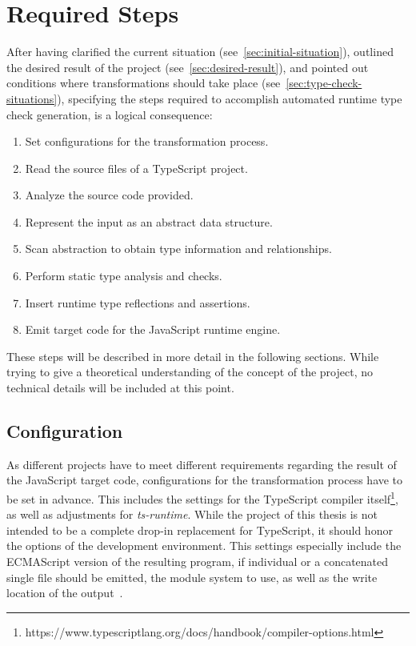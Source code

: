\section{Required Steps}
\label{sec:required-steps}

After having clarified the current situation (see~\ref{sec:initial-situation}), outlined the desired result of the project (see~\ref{sec:desired-result}), and pointed out conditions where transformations should take place (see~\ref{sec:type-check-situations}), specifying the steps required to accomplish automated runtime type check generation, is a logical consequence:
\begin{enumerate}
  \item Set configurations for the transformation process.
  \item Read the source files of a TypeScript project.
  \item Analyze the source code provided.
  \item Represent the input as an abstract data structure.
  \item Scan abstraction to obtain type information and relationships.
  \item Perform static type analysis and checks.
  \item Insert runtime type reflections and assertions.
  \item Emit target code for the JavaScript runtime engine.
\end{enumerate}
These steps will be described in more detail in the following sections. While trying to give a theoretical understanding of the concept of the project, no technical details will be included at this point.

\subsection{Configuration}
\label{sec:steps-configuration}

As different projects have to meet different requirements regarding the result of the JavaScript target code, configurations for the transformation process have to be set in advance. This includes the settings for the TypeScript compiler itself\footnote{https://www.typescriptlang.org/docs/handbook/compiler-options.html}, as well as adjustments for \emph{ts-runtime}. While the project of this thesis is not intended to be a complete drop-in replacement for TypeScript, it should honor the options of the development environment. This settings especially include the ECMAScript version of the resulting program, if individual or a concatenated single file should be emitted, the module system to use, as well as the write location of the output~\cite{TypeScriptHandbook:CompilerOptions}.

